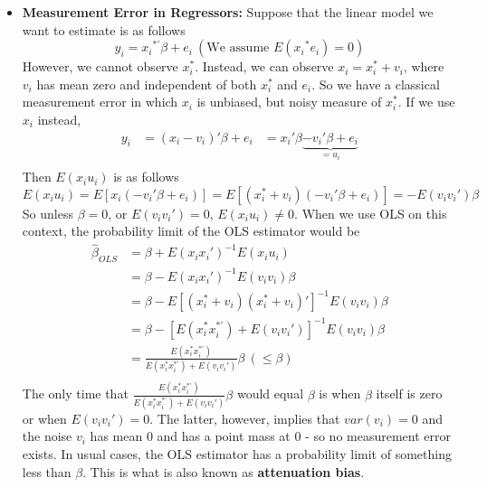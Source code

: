 \documentclass[12pt]{article}
\theoremstyle{definition}
\theoremstyle{property}
\theoremstyle{assumption}
\theoremstyle{example}
\theoremstyle{comment}
\newtheorem{comment}{Comment}[section]
\begin{document}
\begin{itemize}
\item \textbf{Measurement Error in Regressors: }  Suppose that the linear model we want to estimate is as follows
\[
y_i = {x_i}^{*'}\beta+e_i \ (\text{We assume }E({x_i}^{*}e_i)=0)
\]
However, we cannot observe $x_i^*$. Instead, we can observe $x_i=x_i^*+v_i$, where $v_i$ has mean zero and independent of both $x_i^*$ and $e_i$. So we have a classical measurement error in which $x_i$ is unbiased, but noisy measure of $x_i^*$. If we use $x_i$ instead, 
\[
\begin{aligned}
y_i &= (x_i-v_i)'\beta+e_i &=x_i'\beta \underbrace{-v_i'\beta+e_i}_{=u_i} \\
\end{aligned}
\]
Then $E(x_iu_i)$ is as follows
\[
E(x_iu_i)=E[x_i(-v_i'\beta+e_i)]=E[(x_i^{*}+v_i)(-v_i'\beta+e_i)]=-E(v_iv_i')\beta
\]
So unless $\beta=0$, or $E(v_iv_i')=0$, $E(x_iu_i)\neq0$.  When we use OLS on this context, the probability limit of the OLS estimator would be
\[
\begin{aligned}
\hat{\beta}_{OLS} &=\beta+E(x_ix_i')^{-1}E(x_iu_i)\\
&=\beta-E(x_ix_i')^{-1}E(v_iv_i)\beta\\
&=\beta-E[(x_i^*+v_i)(x_i^*+v_i)']^{-1}E(v_iv_i)\beta\\
&=\beta-[E(x_i^*x_i^{*'})+E(v_iv_i')]^{-1}E(v_iv_i)\beta\\
&=\frac{E(x_i^*x_i^{*'})}{E(x_i^*x_i^{*'})+E(v_iv_i')}\beta \ (\leq\beta)\\
\end{aligned}
\]
The only time that $\frac{E(x_i^*x_i^{*'})}{E(x_i^*x_i^{*'})+E(v_iv_i')}\beta$ would equal $\beta$ is when $\beta$ itself is zero or when $E(v_iv_i')=0$. The latter, however, implies that $var(v_i)=0$ and the noise $v_i$ has mean 0 and has a point mass at 0 - so no measurement error exists. In usual cases, the OLS estimator has a probability limit of something less than $\beta$.  This is what is also known as \textbf{attenuation bias}. 
\begin{mdframed}[backgroundcolor=yellow!5] 
\begin{comment}[Comment on Measurement Errors]
So how do we address the endogeneity problem?
\begin{itemize}
\item If there exists another noisy, but unbiased measure of $x_i^*$, namely $w_i=x_i^*+\delta_i$, we can use $w_i$ to instrument for $x_i$. The condition is that $\delta_i$ has mean zero and uncorrelated with $(x_i^*, e_i. v_i)$. Try verifying that this satisfies all IV conditions. 

\end{comment}
\end{mdframed}
\end{itemize}
\end{document}
